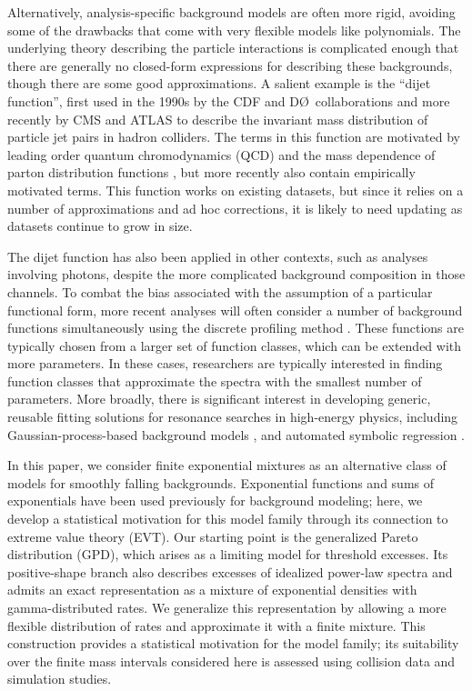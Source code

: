 \documentclass[a4paper,11pt]{article}
\begin{document}
Alternatively, analysis-specific background models are often more rigid, avoiding some of the drawbacks that 
come with very flexible models like polynomials. The underlying theory describing the particle 
interactions is complicated enough that there are generally no closed-form expressions for 
describing these backgrounds, though there are some good approximations. A salient example is 
the ``dijet function'', first used in the 1990s by the CDF and D\O\ collaborations and more 
recently by CMS and ATLAS \cite{Harris:2011bh} to describe the invariant mass distribution of 
particle jet pairs in hadron colliders. The terms in this function are motivated by leading 
order quantum chromodynamics (QCD) and the mass dependence of parton distribution 
functions \cite{Harris:2011bh}, but more recently also contain empirically motivated terms. This function works on existing datasets, but 
since it relies on a number of approximations and ad hoc corrections, it is likely to need 
updating as datasets continue to grow in size.

The dijet function has also been applied in other contexts, such as analyses 
involving photons, despite the more complicated background composition 
in those channels. To combat the bias associated 
with the assumption of a particular functional form, more recent analyses \cite{CMS_DP1, 
CMS_high_mass_diphoton, CMS_DP2, CMS_DP3} will often consider a number of background functions 
simultaneously using the discrete profiling method \cite{discrete-profiling}. These functions 
are typically chosen from a larger set of function classes, which can be extended with more 
parameters. In these cases, researchers are typically interested in finding function classes that 
approximate the spectra with the smallest number of parameters. More broadly, there is significant interest in developing generic, 
reusable fitting solutions for resonance searches in high-energy physics, including 
Gaussian-process-based background models \cite{Frate_2017}, and automated symbolic regression \cite{SymbolFit_2025}.

In this paper, we consider finite exponential mixtures as an alternative class of models for smoothly falling backgrounds. Exponential functions and sums of exponentials have been used previously for background modeling; here, we develop a statistical motivation for this model family through its connection to extreme value theory (EVT). Our starting point is the generalized Pareto distribution (GPD), which arises as a limiting model for threshold excesses. Its positive-shape branch also describes excesses of idealized power-law spectra and admits an exact representation as a mixture of exponential densities with gamma-distributed rates. We generalize this representation by allowing a more flexible distribution of rates and approximate it with a finite mixture. This construction provides a statistical motivation for the model family; its suitability over the finite mass intervals considered here is assessed using collision data and simulation studies.
\end{document}
